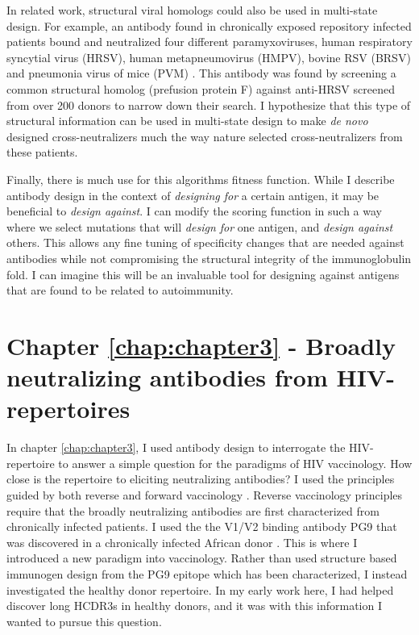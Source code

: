 In related work, structural viral homologs could also be used in multi-state design. For example, an antibody found in chronically exposed repository infected patients bound and neutralized four different paramyxoviruses, human respiratory syncytial virus (HRSV), human metapneumovirus (HMPV), bovine RSV (BRSV) and pneumonia virus of mice (PVM) \citep{Corti:2013cv}. This antibody was found by screening a common structural homolog (prefusion protein F) against anti-HRSV screened from over 200 donors to narrow down their search. I hypothesize that this type of structural information can be used in multi-state design to make \textit{de novo} designed cross-neutralizers much the way nature selected cross-neutralizers from these patients.

Finally, there is much use for this algorithms fitness function. While I describe antibody design in the context of \textit{designing for} a certain antigen, it may be beneficial to \textit{design against}. I can modify the scoring function in such a way where we select mutations that will \textit{design for} one antigen, and \textit{design against} others. This allows any fine tuning of specificity changes that are needed against antibodies while not compromising the structural integrity of the immunoglobulin fold. I can imagine this will be an invaluable tool for designing against antigens that are found to be related to autoimmunity.

\section{Chapter \ref{chap:chapter3} - Broadly neutralizing antibodies from HIV-\naive repertoires}
In chapter \ref{chap:chapter3}, I used antibody design to interrogate the HIV-\naive repertoire to answer a simple question for the paradigms of HIV vaccinology. How close is the \naive repertoire to eliciting neutralizing antibodies? I used the principles guided by both reverse  and forward vaccinology \citep{Burton:2012bh}. Reverse vaccinology principles require that the broadly neutralizing antibodies are first characterized from chronically infected patients. I used the the V1/V2 binding antibody PG9 that was discovered in a chronically infected African donor \citep{McLellan:2011dg,Walker:2009cd}. This is where I introduced a new paradigm into vaccinology. Rather than used structure based immunogen design from the PG9 epitope which has been characterized, I instead investigated the healthy donor repertoire. In my early work here, I had helped discover long HCDR3s in healthy donors, and it was with this information I wanted to pursue this question.

